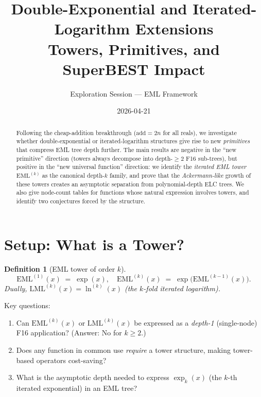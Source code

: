 \documentclass[11pt]{article}
\title{Double-Exponential and Iterated-Logarithm Extensions\\
{\large Towers, Primitives, and SuperBEST Impact}}
\author{Exploration Session --- EML Framework}
\date{2026-04-21}
\newtheorem{definition}[theorem]{Definition}
\begin{document}
\maketitle

\begin{abstract}
Following the cheap-addition breakthrough ($\mathrm{add} = 2n$ for all reals),
we investigate whether double-exponential or iterated-logarithm structures
give rise to new \emph{primitives} that compress EML tree depth further.
The main results are negative in the ``new primitive'' direction (towers always
decompose into depth-$\geq 2$ F16 sub-trees), but positive in the
``new universal function'' direction: we identify the \emph{iterated EML tower}
$\mathrm{EML}^{(k)}$ as the canonical depth-$k$ family, and prove that the
\emph{Ackermann-like} growth of these towers creates an asymptotic separation
from polynomial-depth ELC trees.
We also give node-count tables for functions whose natural expression involves
towers, and identify two conjectures forced by the structure.
\end{abstract}

\tableofcontents
\bigskip

\section{Setup: What is a Tower?}
\label{sec:setup}

\begin{definition}[EML tower of order $k$]
\[
  \mathrm{EML}^{(1)}(x) \;=\; \exp(x), \quad
  \mathrm{EML}^{(k)}(x) \;=\; \exp\!\bigl(\mathrm{EML}^{(k-1)}(x)\bigr).
\]
Dually, $\mathrm{LML}^{(k)}(x) = \ln^{(k)}(x)$ (the $k$-fold iterated logarithm).
\end{definition}

\noindent Key questions:
\begin{enumerate}
  \item Can $\mathrm{EML}^{(k)}(x)$ or $\mathrm{LML}^{(k)}(x)$ be expressed
        as a \emph{depth-1} (single-node) F16 application? (Answer: No for $k \geq 2$.)
  \item Does any function in common use \emph{require} a tower structure,
        making tower-based operators cost-saving?
  \item What is the asymptotic depth needed to express
        $\exp_k(x)$ (the $k$-th iterated exponential) in an EML tree?
\end{enumerate}
\end{document}
